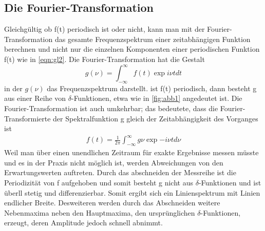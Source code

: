 \subsection{Die Fourier-Transformation}
Gleichgültig ob f(t) periodisch ist oder nicht, kann man mit der Fourier-Transformation das gesamte Frequenzspektrum einer zeitabhängigen Funktion berechnen 
und nicht nur die einzelnen Komponenten einer periodischen Funktion f(t) wie in \ref{eqn:gl2}.
Die Fourier-Transformation hat die Gestalt
\begin{equation}
  g(\nu) = \int_{-\infty}^{\infty} f(t) \exp{i \nu t} dt \label{eqn:gl3}
\end{equation}
in der $g(\nu)$ das Frequenzspektrum darstellt.
ist f(t) periodisch, dann besteht g aus einer Reihe von $\delta$-Funktionen, etwa wie in \ref{fig:abb1} angedeutet ist.
Die Fourier-Transformation ist auch umkehrbar; das bedeutete, dass die Fourier-Transformierte der Spektralfunktion g gleich der Zeitabhängigkeit des Vorganges ist
\begin{align}
  f(t) = \frac{1}{2 \pi} \int_{-\infty}^{\infty} g{\nu} \exp{-i \nu t} d \nu
\end{align}
Weil man über einen unendlichen Zeitraum für exakte Ergebnisse messen müsste und es in der Praxis nicht möglich ist, werden Abweichungen von den Erwartungswerten auftreten.
Durch das abschneiden der Messreihe ist die Periodizität von f aufgehoben und somit besteht g nicht aus $\delta$-Funktionen und ist überll stetig und differenzierbar.
Somit ergibt sich ein Linienspektrum mit Linien endlicher Breite.
Desweiteren werden durch das Abschneiden weitere Nebenmaxima neben den Hauptmaxima, den ursprünglichen $\delta$-Funktionen, erzeugt, deren Amplitude jedoch schnell abnimmt.